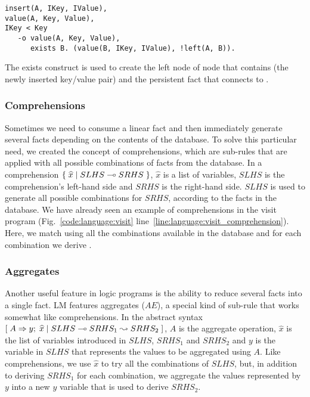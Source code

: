 \begin{Verbatim}[fontsize=\codesize]
insert(A, IKey, IValue),
value(A, Key, Value),
IKey < Key
   -o value(A, Key, Value),
      exists B. (value(B, IKey, IValue), !left(A, B)).
\end{Verbatim}

The exists construct is used to create the left node of node  that
contains  (the newly inserted key/value pair) and
the persistent fact  that connects  to .

\subsubsection{Comprehensions}

Sometimes we need to consume a linear fact and then immediately generate several
facts depending on the contents of the database. To solve this particular need,
we created the concept of comprehensions, which are sub-rules that are applied
with all possible combinations of facts from the database. In a comprehension
$\{ \; \widehat{x} \; | \; SLHS \multimap SRHS \; \}$, $\widehat{x}$ is a list of variables,
$SLHS$ is the comprehension's left-hand side and $SRHS$ is the right-hand side.
$SLHS$ is used to generate all possible combinations for $SRHS$, according to
the facts in the database. We have already seen an example of comprehensions in
the visit program (Fig.~\ref{code:language:visit}
line~\ref{line:language:visit_comprehension}). Here, we match 
using all the combinations available in the database and for each combination we
derive .

\subsubsection{Aggregates}

Another useful feature in logic programs is the ability to reduce several facts
into a single fact. LM features aggregates ($AE$), a special kind of sub-rule
that works somewhat like comprehensions. In the abstract syntax
$[\; A \Rightarrow y; \; \widehat{x} \; | \; SLHS \multimap SRHS_1 \leadsto SRHS_2 \;]$, $A$ is the aggregate
operation, $\widehat{x}$ is the list of variables introduced in $SLHS$, $SRHS_1$
and $SRHS_2$ and $y$ is the variable in $SLHS$ that represents the values to be
aggregated using $A$. Like comprehensions, we use $\widehat{x}$ to try all the
combinations of $SLHS$, but, in addition to deriving $SRHS_1$ for each
combination, we aggregate the values represented by $y$ into a new $y$ variable
that is used to derive $SRHS_2$.

